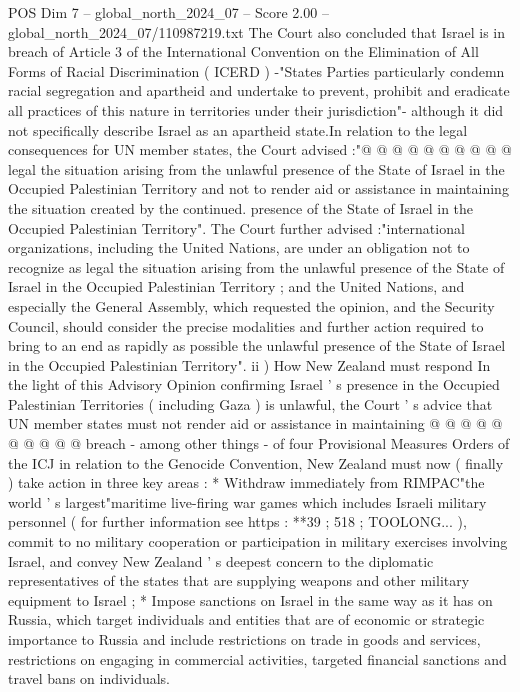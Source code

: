 \begin{textsample}{POS Dim 7 – global\_north\_2024\_07 – Score 2.00 – global\_north\_2024\_07/110987219.txt}
The Court also concluded that Israel is in breach of Article 3 of the International Convention on the Elimination of All Forms of Racial Discrimination ( ICERD ) -"States Parties particularly condemn racial segregation and apartheid and undertake to prevent, prohibit and eradicate all practices of this nature in territories under their jurisdiction"- although it did not specifically describe Israel as an apartheid state.In relation to the legal consequences for UN member states, the Court advised :"@ @ @ @ @ @ @ @ @ @ legal the situation arising from the unlawful presence of the State of Israel in the Occupied Palestinian Territory and not to render aid or assistance in maintaining the situation created by the continued. presence of the State of Israel in the Occupied Palestinian Territory".
The Court further advised :"international organizations, including the United Nations, are under an obligation not to recognize as legal the situation arising from the unlawful presence of the State of Israel in the Occupied Palestinian Territory ; and the United Nations, and especially the General Assembly, which requested the opinion, and the Security Council, should consider the precise modalities and further action required to bring to an end as rapidly as possible the unlawful presence of the State of Israel in the Occupied Palestinian Territory". ii ) How New Zealand must respond In the light of this Advisory Opinion confirming Israel ' s presence in the Occupied Palestinian Territories ( including Gaza ) is unlawful, the Court ' s advice that UN member states must not render aid or assistance in maintaining @ @ @ @ @ @ @ @ @ @ breach - among other things - of four Provisional Measures Orders of the ICJ in relation to the Genocide Convention, New Zealand must now ( finally ) take action in three key areas : * Withdraw immediately from RIMPAC"the world ' s largest"maritime live-firing war games which includes Israeli military personnel ( for further information see https : **39 ; 518 ; TOOLONG... ), commit to no military cooperation or participation in military exercises involving Israel, and convey New Zealand ' s deepest concern to the diplomatic representatives of the states that are supplying weapons and other military equipment to Israel ; * Impose sanctions on Israel in the same way as it has on Russia, which target individuals and entities that are of economic or strategic importance to Russia and include restrictions on trade in goods and services, restrictions on engaging in commercial activities, targeted financial sanctions and travel bans on individuals.

\end{textsample}
